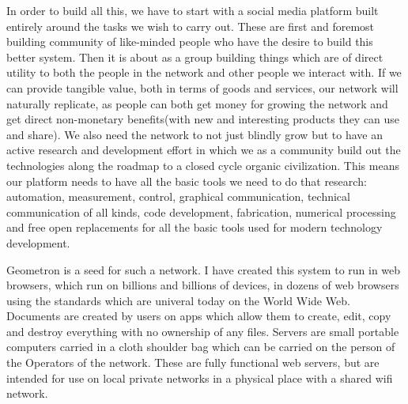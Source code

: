 In order to build all this, we have to start with a social media platform built entirely around the tasks we wish to carry out.  These are first and foremost building community of like-minded people who have the desire to build this better system. Then it is about as a group building things which are of direct utility to both the people in the network and other people we interact with.  If we can provide tangible value, both in terms of goods and services, our network will naturally replicate, as people can both get money for growing the network and get direct non-monetary benefits(with new and interesting products they can use and share).  We also need the network to not just blindly grow but to have an active research and development effort in which we as a community build out the technologies along the roadmap to a closed cycle organic civilization.  This means our platform needs to have all the basic tools we need to do that research: automation, measurement, control, graphical communication, technical communication of all kinds, code development, fabrication, numerical processing and free open replacements for all the basic tools used for modern technology development.  

Geometron is a seed for such a network.  I have created this system to run in web browsers, which run on billions and billions of devices, in dozens of web browsers using the standards which are univeral today on the World Wide Web. Documents are created by users on apps which allow them to create, edit, copy and destroy everything with no ownership of any files.  Servers are small portable computers carried in a cloth shoulder bag which can be carried on the person of the Operators of the network. These are fully functional web servers, but are intended for use on local private networks in a physical place with a shared wifi network.
